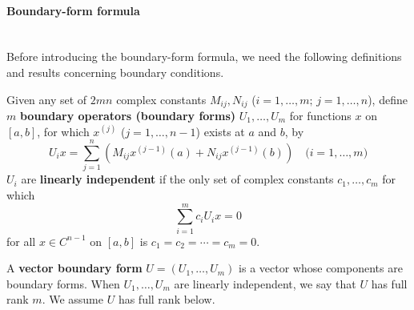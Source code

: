 \documentclass[11pt, oneside, a4paper]{article}
\begin{document}
\paragraph{Boundary-form formula}\mbox{}\\
Before introducing the boundary-form formula, we need the following definitions and results concerning boundary conditions.

\begin{defn}\cite[p.286]{CoddingtonLevinson}\label{defn:boundary form}
    Given any set of $2mn$ complex constants $M_{ij}, N_{ij}$ ($i=1,\ldots, m;\,j=1,\ldots,n$), define $m$ \textbf{boundary operators (boundary forms)} $U_1,\ldots,U_m$ for functions $x$ on $[a,b]$, for which $x^{(j)}$ ($j=1,\ldots,n-1$) exists at $a$ and $b$, by
    \begin{equation}\label{eq:U_i defn}
        U_i x = \sum_{j=1}^n (M_{ij}x^{(j-1)}(a) + N_{ij}x^{(j-1)}(b))\quad\mbox{($i=1,\ldots,m$)} 
    \end{equation}
    $U_i$ are \textbf{linearly independent} if the only set of complex constants $c_1, \ldots, c_m$ for which
    \[\sum_{i=1}^m c_i U_ix=0\]
    for all $x\in C^{n-1}$ on $[a,b]$ is $c_1=c_2=\cdots =c_m=0$.
\end{defn}

\begin{defn}\cite[p.286]{CoddingtonLevinson}\label{defn:vector boundary form}
    A \textbf{vector boundary form} $U=(U_1,\ldots,U_m)$ is a vector whose components are boundary forms. When $U_1,\ldots,U_m$ are linearly independent, we say that $U$ has full rank $m$. We assume $U$ has full rank below.
\end{defn}
\end{document}
